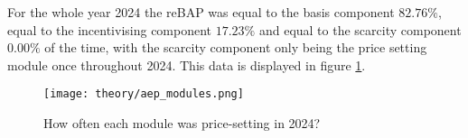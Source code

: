 \documentclass[class=scrbook, crop=false]{standalone}
\begin{document}
For the whole year 2024 the reBAP was equal to the basis component $82.76\%$, equal to the incentivising component $17.23\%$ and equal to the scarcity component $0.00\%$ of the time, with the scarcity component only being the price setting module once throughout 2024. This data is displayed in figure \ref{fig::aep_modules}.

 \begin{figure}[ht]
            \centering
            \texttt{[image: theory/aep\_modules.png]}
             \caption[How often each module was price-setting in 2024?]{How often each module was price-setting in 2024?}
            \label{fig::aep_modules}
 \end{figure}



\ifstandalone
    \printbibliography[heading=bibintoc]                         \cleardoublepage




\fi
\end{document}
